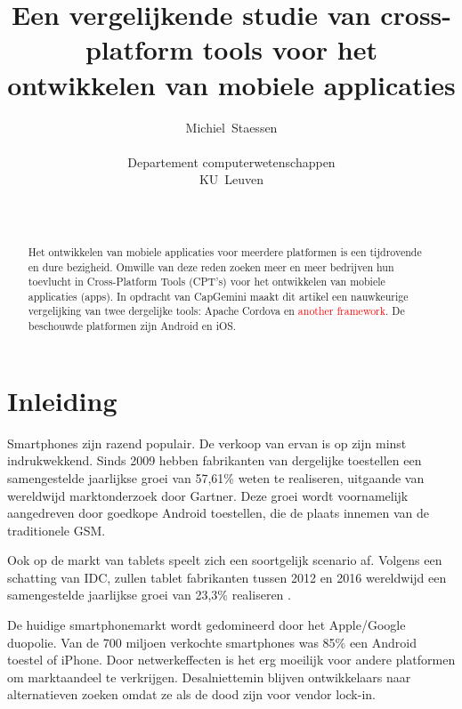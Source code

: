 \documentclass[a4paper,conference]{IEEEconf}
\newcommand{\anotherFramework}{\textcolor{red}{another framework}}
\begin{document}
\title{Een vergelijkende studie van cross-platform tools voor het ontwikkelen van mobiele applicaties}
\author{
    Michiel~Staessen \\
    \begin{affiliation}
       Departement computerwetenschappen\\
       KU~Leuven\\
    \end{affiliation} \\
}
\maketitle

\begin{abstract}
Het ontwikkelen van mobiele applicaties voor meerdere platformen is een tijdrovende en dure bezigheid. Omwille van deze reden zoeken meer en meer bedrijven hun toevlucht in Cross-Platform Tools (CPT's) voor het ontwikkelen van mobiele applicaties (apps). In opdracht van CapGemini maakt dit artikel een nauwkeurige vergelijking van twee dergelijke tools: Apache Cordova en \anotherFramework. De beschouwde platformen zijn Android en iOS.
\end{abstract}

\section{Inleiding}

Smartphones zijn razend populair. De verkoop van ervan is op zijn minst indrukwekkend. Sinds 2009 hebben fabrikanten van dergelijke toestellen een samengestelde jaarlijkse groei van 57,61\% weten te realiseren, uitgaande van wereldwijd marktonderzoek door Gartner. Deze groei wordt voornamelijk aangedreven door goedkope Android toestellen, die de plaats innemen van de traditionele GSM. 

Ook op de markt van tablets speelt zich een soortgelijk scenario af. Volgens een schatting van IDC, zullen tablet fabrikanten tussen 2012 en 2016 wereldwijd een samengestelde jaarlijkse groei van 23,3\% realiseren \cite{IDC:201205}.

De huidige smartphonemarkt wordt gedomineerd door het Apple/Google duopolie. Van de 700 miljoen verkochte smartphones was 85\% een Android toestel of iPhone. Door netwerkeffecten is het erg moeilijk voor andere platformen om marktaandeel te verkrijgen. Desalniettemin blijven ontwikkelaars naar alternatieven zoeken omdat ze als de dood zijn voor vendor lock-in. \cite{VM_DE:2013}
\end{document}
